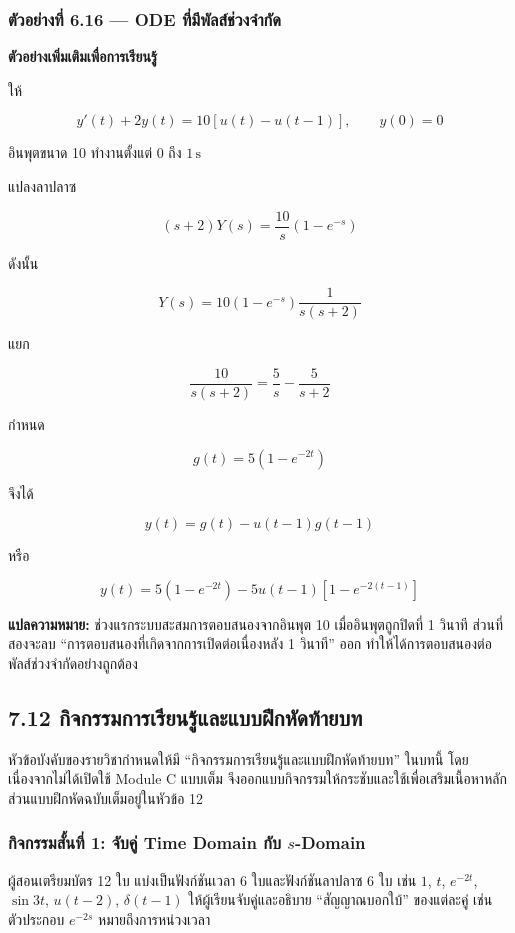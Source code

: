 \subsubsection{ตัวอย่างที่ 6.16 — ODE ที่มีพัลส์ช่วงจำกัด}

\textbf{ตัวอย่างเพิ่มเติมเพื่อการเรียนรู้}

ให้

\[
y'(t)+2y(t)=10[u(t)-u(t-1)],\qquad y(0)=0
\]

อินพุตขนาด 10 ทำงานตั้งแต่ $0$ ถึง $1\,\mathrm{s}$

แปลงลาปลาซ

\[
(s+2)Y(s)=\frac{10}{s}(1-e^{-s})
\]

ดังนั้น

\[
Y(s)=10(1-e^{-s})\frac{1}{s(s+2)}
\]

แยก

\[
\frac{10}{s(s+2)}=\frac{5}{s}-\frac{5}{s+2}
\]

กำหนด

\[
g(t)=5(1-e^{-2t})
\]

จึงได้

\[
\boxed{y(t)=g(t)-u(t-1)g(t-1)}
\]

หรือ

\[
\boxed{y(t)=5(1-e^{-2t})-5u(t-1)\left[1-e^{-2(t-1)}\right]}
\]

\textbf{แปลความหมาย:} ช่วงแรกระบบสะสมการตอบสนองจากอินพุต 10 เมื่ออินพุตถูกปิดที่ 1 วินาที ส่วนที่สองจะลบ “การตอบสนองที่เกิดจากการเปิดต่อเนื่องหลัง 1 วินาที” ออก ทำให้ได้การตอบสนองต่อพัลส์ช่วงจำกัดอย่างถูกต้อง



\subsection{7.12 กิจกรรมการเรียนรู้และแบบฝึกหัดท้ายบท}

หัวข้อบังคับของรายวิชากำหนดให้มี “กิจกรรมการเรียนรู้และแบบฝึกหัดท้ายบท” ในบทนี้ โดยเนื่องจากไม่ได้เปิดใช้ Module C แบบเต็ม จึงออกแบบกิจกรรมให้กระชับและใช้เพื่อเสริมเนื้อหาหลัก ส่วนแบบฝึกหัดฉบับเต็มอยู่ในหัวข้อ 12

\subsubsection{\texorpdfstring{กิจกรรมสั้นที่ 1: จับคู่ Time Domain กับ $s$-Domain}{กิจกรรมสั้นที่ 1: จับคู่ Time Domain กับ s-Domain}}

ผู้สอนเตรียมบัตร 12 ใบ แบ่งเป็นฟังก์ชันเวลา 6 ใบและฟังก์ชันลาปลาซ 6 ใบ เช่น $1$, $t$, $e^{-2t}$, $\sin 3t$, $u(t-2)$, $\delta(t-1)$ ให้ผู้เรียนจับคู่และอธิบาย “สัญญาณบอกใบ้” ของแต่ละคู่ เช่น ตัวประกอบ $e^{-2s}$ หมายถึงการหน่วงเวลา

